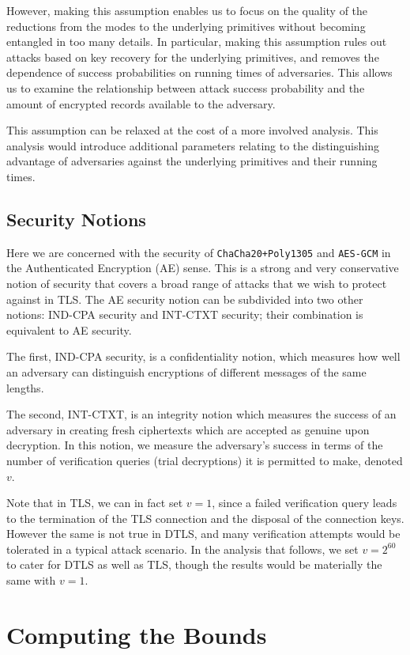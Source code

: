 \documentclass{article}
\begin{document}
However, making this assumption enables us to focus on the quality of the reductions from the modes to the underlying primitives without becoming entangled in too many details. In particular, making this assumption rules out attacks based on key recovery for the underlying primitives, and removes the dependence of success probabilities on running times of adversaries. This allows us to examine the relationship between attack success probability and the amount of encrypted records available to the adversary.

This assumption can be relaxed at the cost of a more involved analysis. This analysis would introduce additional parameters relating to the distinguishing advantage of adversaries against the underlying primitives and their running times. 

\subsection{Security Notions}

Here we are concerned with the security of \texttt{ChaCha20+Poly1305} and  \texttt{AES-GCM} in the Authenticated Encryption (AE) sense. This is a strong and very conservative notion of security that covers a broad range of attacks that we wish to protect against in TLS. The AE security notion can be subdivided into two other notions: IND-CPA security and INT-CTXT security; their combination is equivalent to AE security.

The first, IND-CPA security, is a confidentiality notion, which measures how well an adversary can distinguish encryptions of different messages of the same lengths. 

The second, INT-CTXT, is an integrity notion which measures the success of an adversary in creating fresh ciphertexts which are accepted as genuine upon decryption. In this notion, we measure the adversary's success in terms of the number of verification queries (trial decryptions) it is permitted to make, denoted $v$. 

Note that in TLS, we can in fact set $v=1$, since a failed verification query leads to the termination of the TLS connection and the disposal of the connection keys. However the same is not true in DTLS, and many verification attempts would be tolerated in a typical attack scenario. In the analysis that follows, we set $v= 2^{60}$ to cater for DTLS as well as TLS, though the results would be materially the same with $v=1$.  

\section{Computing the Bounds}
\end{document}
